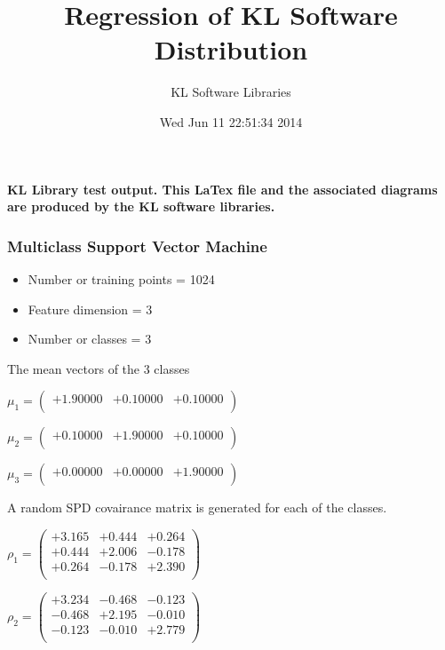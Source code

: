 \documentclass[9pt]{article}
\theoremstyle{plain}
\theoremstyle{definition}
\theoremstyle{remark}
\numberwithin{equation}{section}
\begin{document}
\title{Regression of KL Software Distribution   }
\author{KL Software Libraries}
\date{Wed Jun 11 22:51:34 2014
}
\maketitle
\textbf{ KL Library test output.  This LaTex file and the associated diagrams are produced by the KL software libraries.}
\subsubsection{Multiclass Support Vector Machine }
\begin{itemize}
\item Number or training points = 1024
\item Feature dimension = 3
\item Number or classes = 3
\end{itemize}
{The mean vectors of the 3 classes}

$\mu_1 = \left(
\begin{array}{
ccc}
+1.90000 & +0.10000 & +0.10000 \\
\end{array}
\right)$ \newline 

$\mu_2 = \left(
\begin{array}{
ccc}
+0.10000 & +1.90000 & +0.10000 \\
\end{array}
\right)$ \newline 

$\mu_3 = \left(
\begin{array}{
ccc}
+0.00000 & +0.00000 & +1.90000 \\
\end{array}
\right)$ \newline 

A random SPD covairance matrix is generated for each of the classes.\newline

$\rho_1 = \left(
\begin{array}{
ccc}
+3.165 & +0.444 & +0.264 \\
+0.444 & +2.006 & -0.178 \\
+0.264 & -0.178 & +2.390 \\
\end{array}
\right)$ \newline 

$\rho_2 = \left(
\begin{array}{
ccc}
+3.234 & -0.468 & -0.123 \\
-0.468 & +2.195 & -0.010 \\
-0.123 & -0.010 & +2.779 \\
\end{array}
\right)$ \newline 
\end{document}
